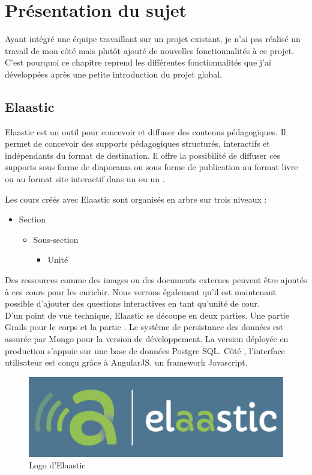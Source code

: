 \chapter{Présentation du sujet}
Ayant intégré une équipe travaillant sur un projet existant, je n'ai pas réalisé
un travail de mon côté mais plutôt ajouté de nouvelles fonctionnalités à ce
projet. C'est pourquoi ce chapitre reprend les différentes fonctionnalités que
j'ai développées après une petite introduction du projet global.

\section{Elaastic}
Elaastic est un outil pour concevoir et diffuser des contenus pédagogiques. Il
permet de concevoir des supports pédagogiques structurés, interactifs et
indépendants du format de destination. Il offre la possibilité de diffuser ces
supports sous forme de diaporama ou sous forme de publication au format livre ou
au format site interactif dans un  ou un .

Les cours créés avec Elaastic sont organisés en arbre sur trois niveaux :
\begin{itemize}
  \item Section
	\begin{itemize}
	  \item Sous-section
		\begin{itemize}
		  \item Unité
		\end{itemize}
	\end{itemize}
\end{itemize}

Des ressources comme des images ou des documents externes peuvent être ajoutés à
ces cours pour les enrichir. Nous verrons également qu'il est maintenant
possible d'ajouter des questions interactives en tant qu'unité de cour.\\

D'un point de vue technique, Elaastic se découpe en deux parties. Une partie
Grails pour le corps et la partie . Le système de persistance
des données est assurée par Mongo pour la version de développement. La version
déployée en production s'appuie sur une base de données Postgre SQL. Côté
, l'interface utilisateur est conçu grâce à AngularJS, un
framework Javascript.

\begin{figure}[h]
  \centering
  \includegraphics[scale=0.4]{images/elaastic_blue.pdf}%
  \caption{Logo d'Elaastic}
  \label{fig:elaastic}
\end{figure}

